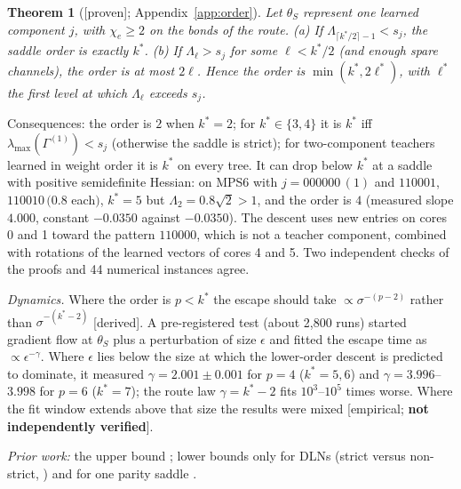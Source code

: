 \documentclass[11pt]{article}
\newcommand{\ev}[1]{\textsf{\small[#1]}}
\newtheorem*{thm*}{Theorem}
\begin{document}
\begin{thm*}[\ev{proven}; Appendix~\ref{app:order}]
Let $\theta_S$ represent one learned component $j$, with $\chi_e\ge2$ on the bonds of the route.
(a) If $\Lambda_{\lceil k^*/2\rceil-1}<s_j$, the saddle order is exactly $k^*$.
(b) If $\Lambda_\ell>s_j$ for some $\ell<k^*/2$ (and enough spare channels), the order is at most $2\ell$.
Hence the order is $\min(k^*,2\ell^*)$, with $\ell^*$ the first level at which $\Lambda_\ell$ exceeds $s_j$.
\end{thm*}
Consequences: the order is $2$ when $k^*=2$; for $k^*\in\{3,4\}$ it is $k^*$ iff $\lambda_{\max}(\Gamma^{(1)})<s_j$
(otherwise the saddle is strict); for two-component teachers learned in weight order it is $k^*$ on every
tree. It can drop below $k^*$ at a saddle with positive semidefinite Hessian: on MPS6 with
$j=000000\,(1)$ and $110001$, $110010\,(0.8$ each$)$, $k^*=5$ but $\Lambda_2=0.8\sqrt2>1$, and the order is $4$
(measured slope $4.000$, constant $-0.0350$ against $-0.0350$). The descent uses new entries on cores 0 and 1
toward the pattern $110000$, which is not a teacher component, combined with rotations of the learned vectors of cores 4 and 5.
Two independent checks of the proofs and 44 numerical instances agree.

\emph{Dynamics.} Where the order is $p<k^*$ the escape should take $\propto\sigma^{-(p-2)}$ rather than
$\sigma^{-(k^*-2)}$ \ev{derived}. A pre-registered test (about 2,800 runs) started gradient flow at $\theta_S$ plus a
perturbation of size $\epsilon$ and fitted the escape time as $\propto\epsilon^{-\gamma}$. Where $\epsilon$ lies below the
size at which the lower-order descent is predicted to dominate, it measured $\gamma=2.001\pm0.001$ for $p=4$
($k^*=5,6$) and $\gamma=3.996$--$3.998$ for $p=6$ ($k^*=7$); the route law $\gamma=k^*-2$ fits $10^3$--$10^5$ times
worse. Where the fit window extends above that size the results were mixed
\ev{empirical; \textbf{not independently verified}}.

\emph{Prior work:} the upper bound \citep{furman2026benign}; lower bounds only for DLNs (strict versus
non-strict, \citealp[Thm~7]{achour2024loss}) and for one parity saddle \citep[Prop.~5.3]{furman2026benign}.
\end{document}
